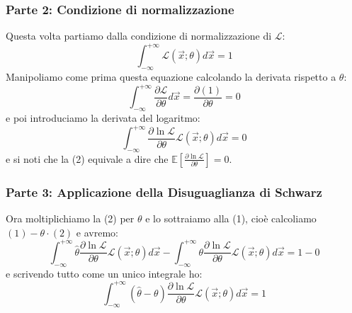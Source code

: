 \documentclass[openany,a4paper,12pt]{book}
\providecommand{\mathscr}[1]{\mathcal{#1}}
\theoremstyle{remark}
\begin{document}
\subsubsection*{Parte 2: Condizione di normalizzazione}
Questa volta partiamo dalla condizione di normalizzazione di $\mathscr{L}$:
\begin{equation}
    \int_{-\infty}^{+\infty} \mathscr{L}(\vec{x}; \theta) d\vec{x} = 1
\end{equation}
Manipoliamo come prima questa equazione calcolando la derivata rispetto a $\theta$:
\begin{equation}
    \int_{-\infty}^{+\infty} \frac{\partial \mathscr{L}}{\partial \theta} d\vec{x} = \frac{\partial (1)}{\partial \theta} = 0
\end{equation}
e poi introduciamo la derivata del logaritmo:
\begin{equation}\tag{2}
    \boxed{ \int_{-\infty}^{+\infty} \frac{\partial \ln \mathscr{L}}{\partial \theta} \mathscr{L}(\vec{x}; \theta) d\vec{x} = 0 }
\end{equation}
e si noti che la (2) equivale a dire che $\mathbb{E}\left[ \frac{\partial \ln \mathscr{L}}{\partial \theta} \right] = 0$.

\subsubsection*{Parte 3: Applicazione della Disuguaglianza di Schwarz}
Ora moltiplichiamo la (2) per $\theta$ e lo sottraiamo alla (1), cioè calcoliamo $(1) - \theta \cdot (2)$ e avremo:
\begin{equation}
    \int_{-\infty}^{+\infty} \hat{\theta} \frac{\partial \ln \mathscr{L}}{\partial \theta} \mathscr{L}(\vec{x}; \theta) d\vec{x} - \int_{-\infty}^{+\infty} \theta \frac{\partial \ln \mathscr{L}}{\partial \theta} \mathscr{L}(\vec{x}; \theta) d\vec{x} = 1 - 0
\end{equation}
e scrivendo tutto come un unico integrale ho:
\begin{equation}\tag{3}
    \boxed{ \int_{-\infty}^{+\infty} (\hat{\theta} - \theta) \frac{\partial \ln \mathscr{L}}{\partial \theta} \mathscr{L}(\vec{x}; \theta) d\vec{x} = 1 } \label{eq: cond. normalizzazione Cramér}
\end{equation}
\end{document}
